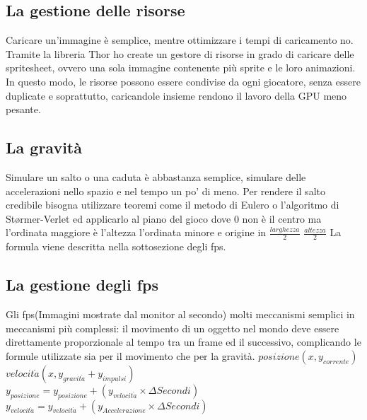 \subsection{La gestione delle risorse}
Caricare un'immagine è semplice, mentre ottimizzare i tempi di caricamento no. Tramite la libreria Thor ho create un gestore di risorse in grado di caricare delle spritesheet, ovvero una sola immagine contenente più sprite e le loro animazioni. In questo modo, le risorse possono essere condivise da ogni giocatore, senza essere duplicate e soprattutto, caricandole insieme rendono il lavoro della GPU meno pesante.
\subsection{La gravità}
Simulare un salto o una caduta è abbastanza semplice, simulare delle accelerazioni nello spazio e nel tempo un po' di meno. Per rendere il salto credibile bisogna utilizzare teoremi come il metodo di Eulero o l'algoritmo di Størmer-Verlet ed applicarlo al piano del gioco dove 0 non è il centro ma l'ordinata maggiore è l'altezza l'ordinata minore e origine in $\frac{larghezza}{2}$ $\frac{altezza}{2}$
La formula viene descritta nella sottosezione degli fps.
\subsection{La gestione degli fps}
Gli fps(Immagini mostrate dal monitor al secondo) molti meccanismi semplici in meccanismi più complessi: il movimento di un oggetto nel mondo deve essere direttamente proporzionale al tempo tra un frame ed il successivo, complicando le formule utilizzate sia per il movimento che per la gravità.
$posizione (x,y_{corrente})$	\\
$velocit\grave{a} (x, y_{gravit\grave{a}} + y_{impulsi})$\\
$y_{posizione} = y_{posizione} + (y_{velocit\grave{a}} \times \Delta{Secondi})$\\
$y_{velocit\grave{a}} = y_{velocit\grave{a}} + (y_{Accelerazione} \times \Delta{Secondi})$\\